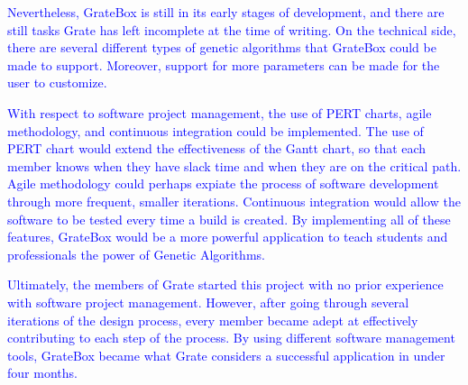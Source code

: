 \documentclass{article}
\begin{document}
\textcolor{blue}{Nevertheless, GrateBox is still in its early stages of 
development, and there 
are still tasks Grate has left incomplete at the time of writing. On the 
technical side, there are several different types of genetic algorithms that 
GrateBox could be made to support. Moreover, support for more parameters can be 
made for the user to customize. }

\textcolor{blue}{With respect to software project management, the use of PERT 
charts, agile 
methodology, and continuous integration could be implemented. The use of PERT 
chart would extend the effectiveness of the Gantt chart, so that each member 
knows when they have slack time and when they are on the critical path. Agile 
methodology could perhaps expiate the process of software development through 
more frequent, smaller iterations. Continuous integration would allow the 
software to be tested every time a build is created. By implementing all of 
these features, GrateBox would be a more powerful application to teach students 
and professionals the power of Genetic Algorithms.}

\textcolor{blue}{Ultimately, the members of Grate started this project with no 
prior experience 
with software project management. However, after going through several 
iterations of the design process, every member became adept at effectively 
contributing to each step of the process. By using different software management 
tools, GrateBox became what Grate considers a successful application in under 
four months.}
\end{document}
